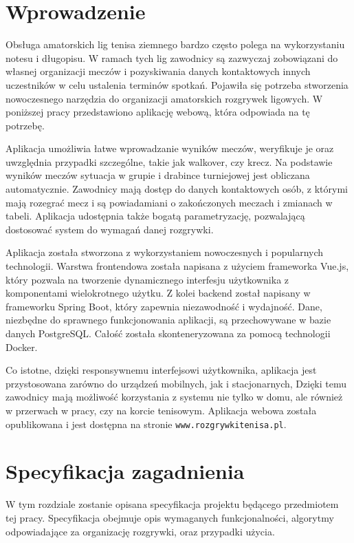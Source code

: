\documentclass[shortabstract]{iithesis}
\author         {Marcin Wróbel}
\begin{document}

\chapter{Wprowadzenie}
Obsługa amatorskich lig tenisa ziemnego bardzo często polega na wykorzystaniu notesu i długopisu.
W ramach tych lig zawodnicy są zazwyczaj zobowiązani do własnej organizacji meczów i pozyskiwania danych kontaktowych innych uczestników w celu ustalenia terminów spotkań.
Pojawiła się potrzeba stworzenia nowoczesnego narzędzia do organizacji amatorskich rozgrywek ligowych.
W poniższej pracy przedstawiono aplikację webową, która odpowiada na tę potrzebę.
\par
Aplikacja umożliwia łatwe wprowadzanie wyników meczów, weryfikuje je oraz uwzględnia przypadki szczególne, takie jak walkover, czy krecz.
Na podstawie wyników meczów sytuacja w grupie i drabince turniejowej jest obliczana automatycznie.
Zawodnicy mają dostęp do danych kontaktowych osób, z którymi mają rozegrać mecz i są powiadamiani o zakończonych meczach i zmianach w tabeli.
Aplikacja udostępnia także bogatą parametryzację, pozwalającą dostosować system do wymagań danej rozgrywki.
\par
Aplikacja została stworzona z wykorzystaniem nowoczesnych i popularnych technologii.
Warstwa frontendowa została napisana z użyciem frameworka Vue.js, który pozwala na tworzenie dynamicznego interfesju użytkownika z komponentami wielokrotnego użytku.
Z kolei backend został napisany w frameworku Spring Boot, który zapewnia niezawodność i wydajność.
Dane, niezbędne do sprawnego funkcjonowania aplikacji, są przechowywane w bazie danych PostgreSQL.
Całość została skonteneryzowana za pomocą technologii Docker.
\par 
Co istotne, dzięki responsywnemu interfejsowi użytkownika, aplikacja jest przystosowana zarówno do urządzeń mobilnych, jak i stacjonarnych,
Dzięki temu zawodnicy mają możliwość korzystania z systemu nie tylko w domu, ale również w przerwach w pracy, czy na korcie tenisowym.
Aplikacja webowa została opublikowana i jest dostępna na stronie \texttt{www.rozgrywkitenisa.pl}.
\par

\chapter{Specyfikacja zagadnienia}
W tym rozdziale zostanie opisana specyfikacja projektu będącego przedmiotem tej pracy.
Specyfikacja obejmuje opis wymaganych funkcjonalności, algorytmy odpowiadające za organizację rozgrywki, oraz przypadki użycia.
\end{document}

